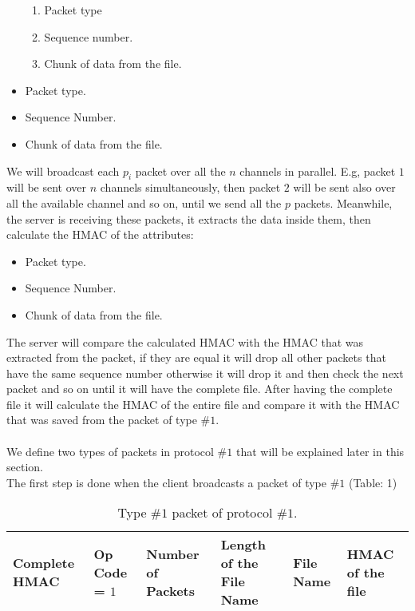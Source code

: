 \documentclass[main.tex]{subfiles}
\begin{document}
\begin{itemize}
\begin{enumerate}
\item Packet type
\item Sequence number.
\item Chunk of data from the file.
\end{enumerate}
\item Packet type.
\item Sequence Number.
\item Chunk of data from the file.
\end{itemize} We will broadcast each $p_{i}$ packet over all the $n$ channels in parallel. E.g, packet $1$ will be sent over $n$ channels simultaneously, then packet $2$ will be sent also over all the available channel and so on, until we send all the $p$ packets. Meanwhile, the server is receiving these packets, it extracts the data inside them, then calculate the HMAC of the attributes: \begin{itemize}
\item Packet type.
\item Sequence Number.
\item Chunk of data from the file.
\end{itemize}
The server will compare the calculated HMAC with the HMAC that was extracted from the packet, if they are equal it will drop all other packets that have the same sequence number otherwise it will drop it and then check the next packet and so on until it will have the complete file. After having the complete file it will calculate the HMAC of the entire file and compare it with the HMAC that was saved from the packet of type $\#1$.
\paragraph{}
We define two types of packets in protocol \#$1$ that will be explained later in this section. \\The first step is done when the client broadcasts a packet of type $\#1$ (Table: 1)\\
\begin{table*}[!h]
\begin{center}
\begin{tabu} to 0.9\textwidth { | X[c]  | X[c]  | X[c]  | X[c] | X[c]  | X[c] | }
 \hline
 Complete HMAC &Op Code = $1$ & Number of Packets & Length of the File Name & File Name & HMAC of the file\\
\hline
\end{tabu}
\caption{Type \#$1$ packet of protocol \#$1$.}
    \label{tab:table$1$}
\end{center}
\end{table*}
\end{document}
